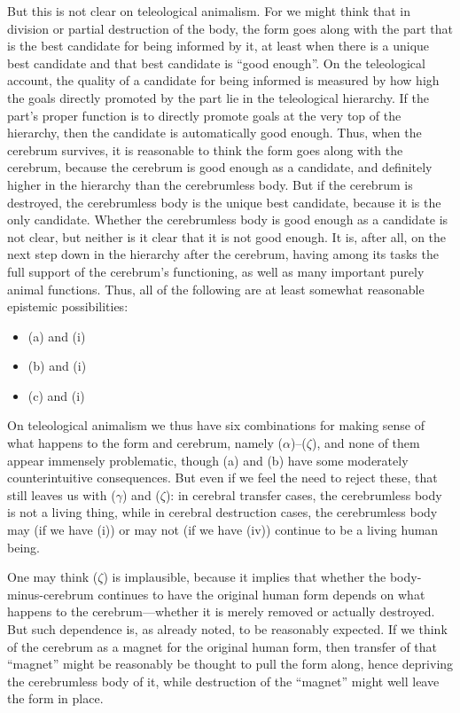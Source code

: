 But this is not clear on teleological animalism. For we might think that in division or partial destruction of the body, the form 
goes along with the part that is the best candidate for being informed by it, at least when there is a unique best candidate and that best 
candidate is ``good enough''. On the teleological account, the quality of a candidate for being informed is measured 
by how high the goals directly promoted by the part lie in the teleological hierarchy. If the part's
proper function is to directly promote goals at the very top of the hierarchy, then the candidate is automatically
good enough. Thus, when the cerebrum survives, it is reasonable to think the form goes along with the cerebrum, because the cerebrum
is good enough as a candidate, and definitely higher in the hierarchy than the cerebrumless body. But if the cerebrum is destroyed, the cerebrumless
body is the unique best candidate, because it is the only candidate. Whether the cerebrumless body is good enough as a candidate is not clear, but neither is it
clear that it is not good enough. It is, after all, on the next step down in the hierarchy after the cerebrum, having among its tasks the full
support of the cerebrum's functioning, as well as many important purely animal functions. Thus, all of the following are at least somewhat reasonable 
epistemic possibilities:
\begin{itemize}
\item[($\delta$)] (a) and (i)
\item[($\e$)] (b) and (i)
\item[($\zeta$)] (c) and (i)
\end{itemize}

On teleological animalism we thus have six combinations for making sense of what happens to the form and cerebrum, namely ($\alpha$)--($\zeta$), 
and none of them appear immensely problematic, though (a) and (b) have some moderately counterintuitive consequences. But even if we feel
the need to reject these, that still leaves us with ($\gamma$) and ($\zeta$): in cerebral transfer cases, the cerebrumless body is not a living
thing, while in cerebral destruction cases, the cerebrumless body may (if we have (i)) or may not (if we have (iv)) continue to be a living
human being. 

One may think ($\zeta$) is implausible, because it implies that whether the body-minus-cerebrum continues to have the original human
form depends on what happens to the cerebrum---whether it is merely removed or actually destroyed. But such dependence is, as already
noted, to be reasonably expected. If we think of the cerebrum as a magnet for the original human form, then transfer of that ``magnet''
might be reasonably be thought to pull the form along, hence depriving the cerebrumless body of it, while destruction of the ``magnet'' might
well leave the form in place. 

